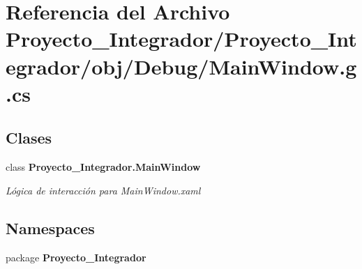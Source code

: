 \section{Referencia del Archivo Proyecto\-\_\-\-Integrador/\-Proyecto\-\_\-\-Integrador/obj/\-Debug/\-Main\-Window.g.\-cs}
\label{_main_window_8g_8cs}
\subsection*{Clases}
\begin{DoxyCompactItemize}
\item 
class {\bf Proyecto\-\_\-\-Integrador.\-Main\-Window}
\begin{DoxyCompactList}\small\item\em Lógica de interacción para Main\-Window.\-xaml \end{DoxyCompactList}\end{DoxyCompactItemize}
\subsection*{Namespaces}
\begin{DoxyCompactItemize}
\item 
package {\bf Proyecto\-\_\-\-Integrador}
\end{DoxyCompactItemize}
